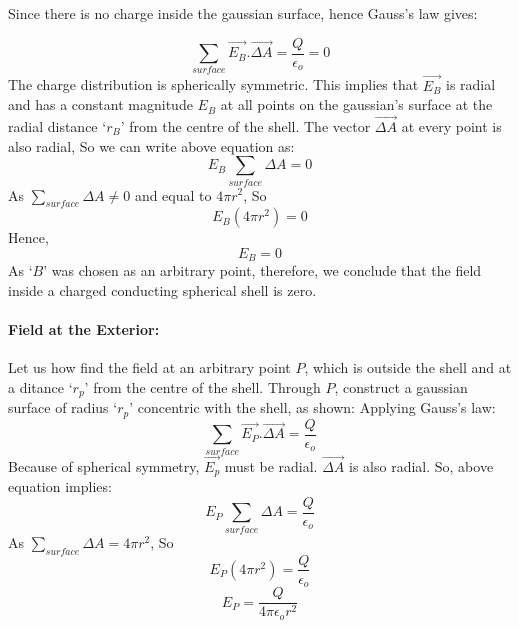 Since there is no charge inside the gaussian surface,
hence Gauss’s law gives:

\begin{equation}
  \sum_{surface} \vec{E_{B}}.\vec{\Delta A}  = \frac{Q}{\epsilon_{o}} = 0 \nonumber
\end{equation}
The charge distribution is spherically symmetric. This implies that $\vec{E_{B}}$
is radial and has a constant magnitude $E_{B}$ at all points on the
gaussian’s surface at the radial distance `$r_{B}$’ from the centre of
the shell. The vector $\vec{\Delta A}$ at every point is also radial,
So we can write above equation as:
\begin{equation}
  E_{B}\sum_{surface} \Delta A = 0 \nonumber
\end{equation}
As $\sum_{surface} \Delta A \neq 0$ and equal to $4\pi r^{2}$, So
\begin{equation}
  E_{B}(4\pi r^{2}) = 0 \nonumber
\end{equation}
Hence,
\begin{equation}
  E_{B} = 0 \nonumber
\end{equation}
As `$B$' was chosen as an arbitrary point, therefore, we conclude
that the field inside a charged conducting spherical shell is zero.
\paragraph{Field at the Exterior:}
Let us how find the field at an arbitrary point $P$,
which is outside the shell and at a ditance `$r_{p}$' from the
centre of the shell. Through $P$, construct a gaussian surface of 
radius `$r_{p}$' concentric with the shell, as shown:
Applying Gauss’s law:
\begin{equation}
  \sum_{surface} \vec{E_{P}}.\vec{\Delta A}  = \frac{Q}{\epsilon_{o}} \nonumber
\end{equation}
Because of spherical symmetry, $\vec{E_{p}}$ must be radial. $\vec{\Delta A}$
is also radial. So, above equation implies:
\begin{equation}
  E_{P}\sum_{surface} \Delta A = \frac{Q}{\epsilon_{o}} \nonumber
\end{equation}
As $\sum_{surface} \Delta A = 4\pi r^{2}$, So
\begin{equation}
  E_{P}(4\pi r^{2}) = \frac{Q}{\epsilon_{o}}  \nonumber
\end{equation}
\begin{equation}\label{eq:11.25}
  E_{P} = \frac{Q}{4\pi\epsilon_{o}r^{2}} 
\end{equation}
